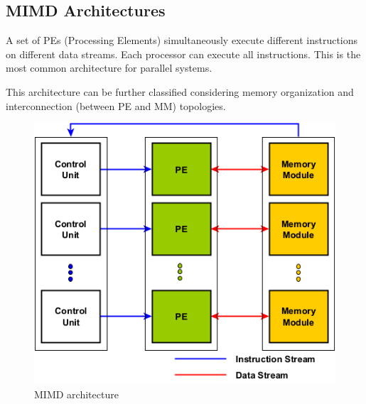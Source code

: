 \subsection{MIMD Architectures}
\begin{paracol}{2}
   \colfill
   A set of PEs (Processing Elements) simultaneously execute different instructions on different data streams. 
   Each processor can execute all instructions.
   This is the most common architecture for parallel systems.

   This architecture can be further classified considering memory organization and interconnection (between PE and MM) topologies.
   \colfill
   
   \switchcolumn

   \begin{figure}[htbp]
      \centering
      \includegraphics{images/03/mimd.png}
      \caption{MIMD architecture}
      \label{fig:03/mimd}
   \end{figure}
   
\end{paracol}

\newpage

